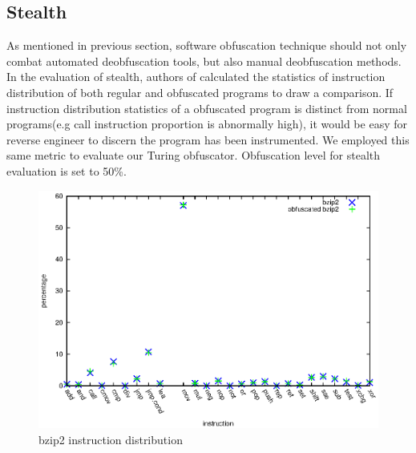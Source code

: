 \documentclass[lnicst]{svmultln}
\begin{document}
\subsection{Stealth}
As mentioned in previous section, software obfuscation technique should not only combat automated deobfuscation tools, but also manual deobfuscation methods. In the evaluation of stealth, authors of \cite{Trans} calculated the statistics of instruction distribution of both regular and obfuscated programs to draw a comparison. If instruction distribution statistics of a obfuscated program is distinct from normal programs(e.g call instruction proportion is abnormally high), it would be easy for reverse engineer to discern the program has been instrumented. We employed this same metric to evaluate our Turing obfuscator. Obfuscation level for stealth evaluation is set to 50\%.
\begin{figure}
  \includegraphics[width=0.9\linewidth]{st_bzip2.eps}
  \caption{bzip2 instruction distribution}
  \label{Figure 4}
\end{figure}
%
%
\end{document}
